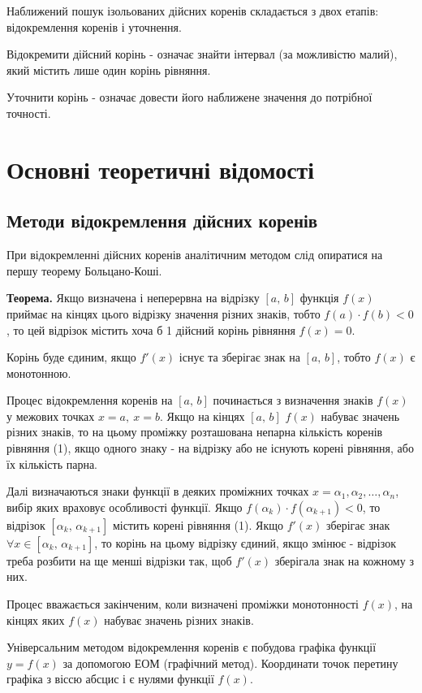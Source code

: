 \documentclass[14pt,a4paper,titlepage]{extarticle}
\begin{document}
Наближений пошук ізольованих дійсних коренів складається з двох етапів: відокремлення коренів і уточнення.

Відокремити дійсний корінь - означає знайти інтервал (за можливістю малий), який містить лише один корінь рівняння.

Уточнити корінь - означає довести його наближене значення до потрібної точності.
\newpage
{\centering \section{Основні теоретичні відомості}}
{\centering \subsection{Методи відокремлення дійсних коренів}}

При відокремленні дійсних коренів аналітичним методом слід опиратися на першу теорему Больцано-Коші.

{\bf Теорема.} Якщо визначена і неперервна на відрізку $[a,\, b]$ функція $f(x)$ приймає на кінцях цього відрізку значення різних знаків, тобто $f(a)\cdot f(b)<0$, то цей відрізок містить хоча б 1 дійсний корінь рівняння $f(x)=0$.

Корінь буде єдиним, якщо $f'(x)$ існує та зберігає знак на $[a,\, b]$, тобто $f(x)$ є монотонною.

Процес відокремлення коренів на $[a,\, b]$ починається з визначення знаків $f(x)$ у межових точках $x=a,\ x=b$. Якщо на кінцях $[a,\, b]$ $f(x)$ набуває значень різних знаків, то на цьому проміжку розташована непарна кількість коренів рівняння (1), якщо одного знаку - на відрізку або не існують корені рівняння, або їх кількість парна.

Далі визначаються знаки функції в деяких проміжних точках $x=\alpha_1,\alpha_2,\ldots,\alpha_n$, вибір яких враховує особливості функції. Якщо $f(\alpha_k)\cdot f(\alpha_{k+1})<0$, то відрізок $[\alpha_k,\,\alpha_{k+1}]$ містить корені рівняння (1). Якщо $f'(x)$ зберігає знак $\forall x\in[\alpha_k,\,\alpha_{k+1}]$, то корінь на цьому відрізку єдиний, якщо змінює - відрізок треба розбити на ще менші відрізки так, щоб $f'(x)$ зберігала знак на кожному з них.

Процес вважається закінченим, коли визначені проміжки монотонності $f(x)$, на кінцях яких $f(x)$ набуває значень різних знаків.

Універсальним методом відокремлення коренів є побудова графіка функції $y=f(x)$ за допомогою ЕОМ (графічний метод). Координати точок перетину графіка з віссю абсцис і є нулями функції $f(x)$.
\end{document}

